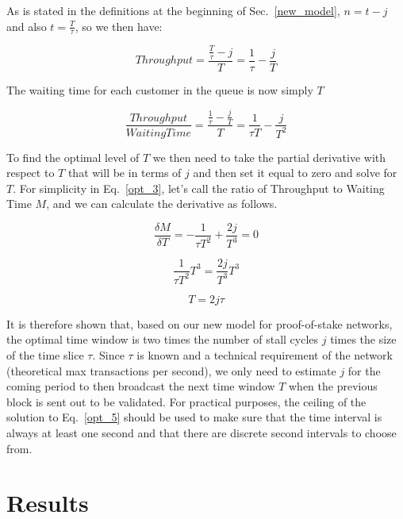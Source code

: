 \documentclass[conference]{IEEEtran}
\begin{document}
As is stated in the definitions at the beginning of Sec.~\ref{new_model},
$n=t-j$ and also $t = \frac{T}{\tau}$, so we then have:

\begin{equation}
  Throughput = \frac{\frac{T}{\tau}-j}{T}=\frac{1}{\tau}-\frac{j}{T}\label{opt_2}
\end{equation}

The waiting time for each customer in the queue is now simply $T$

\begin{equation}
  \frac{Throughput}{WaitingTime} = \frac{\frac{1}{\tau}-\frac{j}{T}}{T} = \frac{1}{\tau T}-\frac{j}{T^2}\label{opt_2}
\end{equation}

To find the optimal level of $T$ we then need to take the partial derivative with respect to $T$ that will
be in terms of $j$ and then set it equal to zero and solve for $T$. For simplicity in Eq.~\ref{opt_3}, 
let's call the ratio of Throughput to Waiting Time $M$, and we can calculate the derivative as follows.

\begin{equation}
  \frac{\delta M}{\delta T} = -\frac{1}{\tau T^2}+\frac{2j}{T^3}=0\label{opt_3}
\end{equation}

\begin{equation}
  \frac{1}{\tau T^2}T^3=\frac{2j}{T^3}T^3\label{opt_4}
\end{equation}

\begin{equation}
  T=2j\tau \label{opt_5}
\end{equation}

It is therefore shown that, based on our new model for proof-of-stake networks, the optimal 
time window is two times the number of stall cycles $j$ times the size of the time slice $\tau$.
Since $\tau$ is known and a technical requirement of the network (theoretical max transactions
per second), we only need to estimate $j$ for the coming period to then broadcast the next time 
window $T$ when the previous block is sent out to be validated. For practical purposes, the 
ceiling of the solution to Eq.~\ref{opt_5} should be used to make sure that the time interval is always at least one
second and that there are discrete second intervals to choose from.
\fi

\section{Results}
\end{document}
